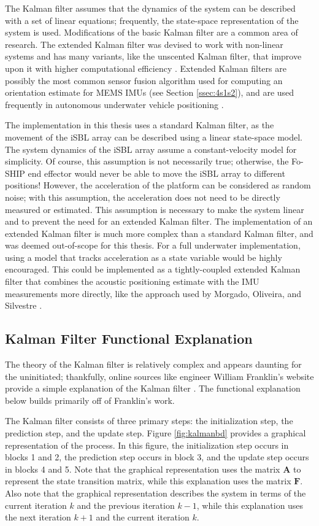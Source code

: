 \documentclass[12pt,a4paper]{report}
\begin{document}
The Kalman filter assumes that the dynamics of the system can be described with a set of linear equations; frequently, the state-space representation of the system is used. Modifications of the basic Kalman filter are a common area of research. The extended Kalman filter was devised to work with non-linear systems and has many variants, like the unscented Kalman filter, that improve upon it with higher computational efficiency \cite{kfsimply}. Extended Kalman filters are possibly the most common sensor fusion algorithm used for computing an orientation estimate for MEMS IMUs \cite{madgwick} (see Section \ref{ssec:4s1s2}), and are used frequently in autonomous underwater vehicle positioning \cite{tightekf} \cite{iusblukf}. 

The implementation in this thesis uses a standard Kalman filter, as the movement of the iSBL array can be described using a linear state-space model. The system dynamics of the iSBL array assume a constant-velocity model for simplicity. Of course, this assumption is not necessarily true; otherwise, the Fo-SHIP end effector would never be able to move the iSBL array to different positions! However, the acceleration of the platform can be considered as random noise; with this assumption, the acceleration does not need to be directly measured or estimated. This assumption is necessary to make the system linear and to prevent the need for an extended Kalman filter. The implementation of an extended Kalman filter is much more complex than a standard Kalman filter, and was deemed out-of-scope for this thesis. For a full underwater implementation, using a model that tracks acceleration as a state variable would be highly encouraged. This could be implemented as a tightly-coupled extended Kalman filter that combines the acoustic positioning estimate with the IMU measurements more directly, like the approach used by Morgado, Oliveira, and Silvestre \cite{tightekf}.

\subsection{Kalman Filter Functional Explanation} \label{ssec:5s1s2}
The theory of the Kalman filter is relatively complex and appears daunting for the uninitiated; thankfully, online sources like engineer William Franklin’s website provide a simple explanation of the Kalman filter \cite{kfsimply}. The functional explanation below builds primarily off of Franklin’s work.

The Kalman filter consists of three primary steps: the initialization step, the prediction step, and the update step. Figure \ref{fig:kalmanbd} provides a graphical representation of the process. In this figure, the initialization step occurs in blocks 1 and 2, the prediction step occurs in block 3, and the update step occurs in blocks 4 and 5. Note that the graphical representation uses the matrix \(\mathbf{A}\) to represent the state transition matrix, while this explanation uses the matrix \(\mathbf{F}\). Also note that the graphical representation describes the system in terms of the current iteration \(k\) and the previous iteration \(k-1\), while this explanation uses the next iteration \(k+1\) and the current iteration \(k\).
\end{document}
